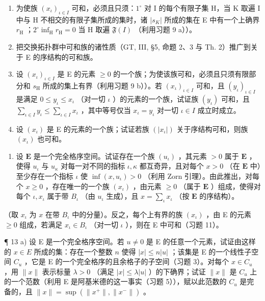 \begin{enumerate}
\def\labelenumi{\alph{enumi})}
\item
  为使族 \((x_{\iota})_{\iota \in I}\) 可和，必须且只须：\(1^{\circ}\) 对 I 的每个有限子集 H，当 K 取遍 I 中与 H 不相交的有限子集所成的集时，诸 \(|s_{K}|\) 所成的集在 E 中有一个上确界 \(r_{\mathrm{H}}\) ；\(2^{\circ} \inf_{\mathrm{H}} r_{\mathrm{H}} = 0\) 当 H 取遍 \(\mathfrak{F}(I)\) （利用习题 9 a））。
\item
  把交换拓扑群中可和族的诸性质（GT, III, §5, 命题 2、3 与 Th. 2）推广到关于 E 的序结构的可和族。
\item
  设 \((x_{\iota})_{\iota \in I}\) 是 E 的元素 \(\geqslant 0\) 的一个族；为使该族可和，必须且只须有限部分和 \(s_{\mathrm{H}}\) 所成的集上有界（利用习题 9 b））。若 \((x_{\iota})_{\iota \in I}\) 可和，且 \((y_{\iota})_{\iota \in I}\) 是满足 \(0 \leqslant y_{\iota} \leqslant x_{\iota}\) （对一切 \(\iota\) ）的元素的一个族，试证族 \((y_{\iota})\) 可和，且 \(\sum_{\iota \in I} y_{\iota} \leqslant \sum_{\iota \in I} x_{\iota}\) ，其中等号仅当 \(x_{\iota} = y_{\iota}\) 对一切 \(\iota \in I\) 成立时成立。
\item
  设 \((x_{\iota})\) 是 E 的元素的一个族；试证若族 \((|x_{\iota}|)\) 关于序结构可和，则族 \((x_{\iota})\) 也可和。
\end{enumerate}

\begin{enumerate}
\def\labelenumi{\arabic{enumi})}
\setcounter{enumi}{11}
\tightlist
\item
  设 \(\mathbf{E}\) 是一个完全格序空间。试证存在一个族 \((u_{\iota})\) ，其元素 \(> 0\) 属于 \(\mathbf{E}\) ，使得 \(u_{\iota}\) 与 \(u_{\kappa}\) 对每一对不同的指标 \(\iota, \kappa\) 都互奇异，且对每个 \(x > 0\) （在 \(\mathbf{E}\) 中）至少存在一个指标 \(\iota\) 使 \(\inf(x, u_{\iota}) > 0\) （利用 Zorn 引理）。由此推出，对每个 \(x \geqslant 0\) ，存在唯一的一个族 \((x_{\iota})\) ，由元素 \(\geqslant 0\) （属于 \(\mathbf{E}\) ）组成，使得对每个 \(\iota, x_{\iota}\) 属于带 \(B_{\iota}\) （由 \(u_{\iota}\) 生成），且 \(x = \sum_{\iota} x_{\iota}\) （按 \(\mathbf{E}\) 的序结构）。
\end{enumerate}

（取 \(x_{\iota}\) 为 \(x\) 在带 \(B_{\iota}\) 中的分量）。反之，每个上有界的族 \((x_{\iota})\) ，由 E 的元素 \(\geqslant 0\) 组成，若满足 \(x_{\iota} \in B_{\iota}\) （对一切 \(\iota\) ），则在 E 中可和（习题 11）。

¶ 13 a) 设 E 是一个完全格序空间。若 \(u \neq 0\) 是 E 的任意一个元素，试证由这样的 \(x \in E\) 所成的集：存在一个整数 \(n\) 使得 \(|x| \leqslant n|u|\) ；该集是 E 的一个线性子空间 \(C_u\) ，它是 E 的一个完全格序的且余格子的子空间（习题 3）。对每个 \(x \in C_u\) ，用 \(\|x\|\) 表示标量 \(\lambda > 0\) （满足 \(|x| \leqslant \lambda |u|\) ）的下确界；试证 \(\|x\|\) 是 \(C_u\) 上的一个范数（利用 E 是阿基米德的这一事实（习题 5）），赋以此范数的 \(C_u\) 是完备的，且 \(\|x\| = \sup(\|x^+\|, \|x^-\|)\) 。

